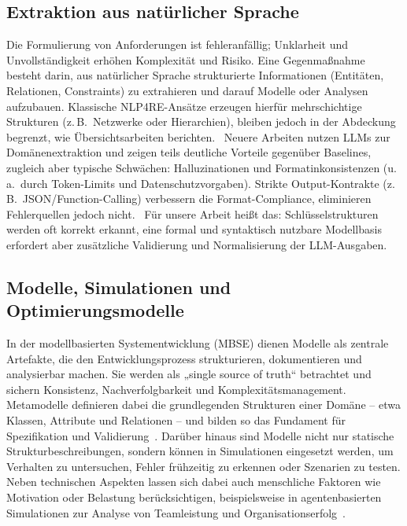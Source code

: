 \documentclass[runningheads]{llncs}
\begin{document}
\subsection{Extraktion aus natürlicher Sprache}
Die Formulierung von Anforderungen ist fehleranfällig; Unklarheit und Unvollständigkeit erhöhen Komplexität und Risiko. Eine Gegenmaßnahme besteht darin, aus natürlicher Sprache strukturierte Informationen (Entitäten, Relationen, Constraints) zu extrahieren und darauf Modelle oder Analysen aufzubauen. Klassische NLP4RE-Ansätze erzeugen hierfür mehrschichtige Strukturen (z.\,B.\ Netzwerke oder Hierarchien), bleiben jedoch in der Abdeckung begrenzt, wie Übersichtsarbeiten berichten.~\cite{vierlboeck2022naturallanguagerequirementsengineering} Neuere Arbeiten nutzen LLMs zur Domänenextraktion und zeigen teils deutliche Vorteile gegenüber Baselines, zugleich aber typische Schwächen: Halluzinationen und Formatinkonsistenzen (u.\,a.\ durch Token-Limits und Datenschutzvorgaben). Strikte Output-Kontrakte (z.\,B.\ JSON/Function-Calling) verbessern die Format-Compliance, eliminieren Fehlerquellen jedoch nicht.~\cite{ref_article5,ref_proc1} Für unsere Arbeit heißt das: Schlüsselstrukturen werden oft korrekt erkannt, eine formal und syntaktisch nutzbare Modellbasis erfordert aber zusätzliche Validierung und Normalisierung der LLM-Ausgaben.

\subsection{Modelle, Simulationen und Optimierungsmodelle}

In der modellbasierten Systementwicklung (MBSE) dienen Modelle als zentrale Artefakte, die den Entwicklungsprozess strukturieren, dokumentieren und analysierbar machen. Sie werden als „single source of truth“ betrachtet und sichern Konsistenz, Nachverfolgbarkeit und Komplexitätsmanagement. Metamodelle definieren dabei die grundlegenden Strukturen einer Domäne – etwa Klassen, Attribute und Relationen – und bilden so das Fundament für Spezifikation und Validierung~\cite{ref_article6}. Darüber hinaus sind Modelle nicht nur statische Strukturbeschreibungen, sondern können in Simulationen eingesetzt werden, um Verhalten zu untersuchen, Fehler frühzeitig zu erkennen oder Szenarien zu testen. Neben technischen Aspekten lassen sich dabei auch menschliche Faktoren wie Motivation oder Belastung berücksichtigen, beispielsweise in agentenbasierten Simulationen zur Analyse von Teamleistung und Organisationserfolg~\cite{ref_proc1}.
\end{document}
